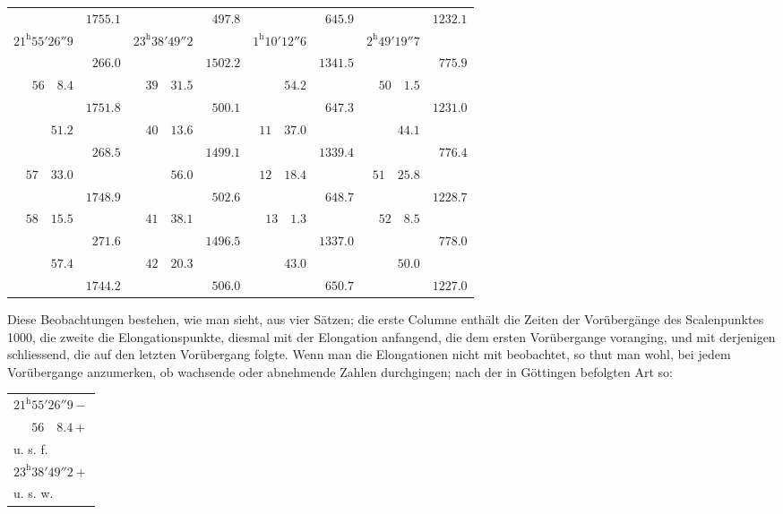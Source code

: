 \begin{center}
\begingroup\fontsize{9}{11}\selectfont\setlength{\tabcolsep}{2pt}
\begin{tabular}{r|r||r|r||r|r||r|r}
& $1755.1$ && $497.8$ && $645.9$ && $1232.1$ \\[-4pt]
$21^{\mathrm{h}}55'26''9$ && $23^{\mathrm{h}}38'49''2$ && $1^{\mathrm{h}}10'12''6$ && $2^{\mathrm{h}}49'19''7$ & \\[-4pt]
& $266.0$ && $1502.2$ && $1341.5$ && $775.9$ \\[-4pt]
$56\quad8.4$ && $39\quad31.5$ && $54.2$ && $50\quad1.5$ & \\[-4pt]
& $1751.8$ && $500.1$ && $647.3$ && $1231.0$ \\[-4pt]
$51.2$ && $40\quad13.6$ && $11\quad37.0$ && $44.1$ & \\[-4pt]
& $268.5$ && $1499.1$ && $1339.4$ && $776.4$ \\[-4pt]
$57\quad33.0$ && $56.0$ && $12\quad18.4$ && $51\quad25.8$ & \\[-4pt]
& $1748.9$ && $502.6$ && $648.7$ && $1228.7$ \\[-4pt]
$58\quad15.5$ && $41\quad38.1$ && $13\quad1.3$ && $52\quad8.5$ & \\[-4pt]
& $271.6$ && $1496.5$ && $1337.0$ && $778.0$ \\[-4pt]
$57.4$ && $42\quad20.3$ && $43.0$ && $50.0$ & \\[-4pt]
& $1744.2$ && $506.0$ && $650.7$ && $1227.0$
\end{tabular}\endgroup
\end{center}

\par\clearpage
{}
Diese Beobachtungen bestehen, wie man sieht, aus vier Sätzen; die erste Columne enthält die Zeiten der Vorübergänge des Scalenpunktes 1000, die zweite die Elongationspunkte, diesmal mit der Elongation anfangend, die dem ersten Vorübergange voranging, und mit derjenigen schliessend, die auf den letzten Vorübergang folgte. Wenn man die Elongationen nicht mit beobachtet, so thut man wohl, bei jedem Vorübergange anzumerken, ob wachsende oder abnehmende Zahlen durchgingen; nach der in Göttingen befolgten Art so:
\begin{center}
\begin{tabular}{l}
$21^{\mathrm{h}}55'26''9-$ \\
$\phantom{21^{\mathrm{h}}}56\quad8.4+$ \\
u. s. f. \\
$23^{\mathrm{h}}38'49''2+$ \\
u. s. w.
\end{tabular}
\end{center}

